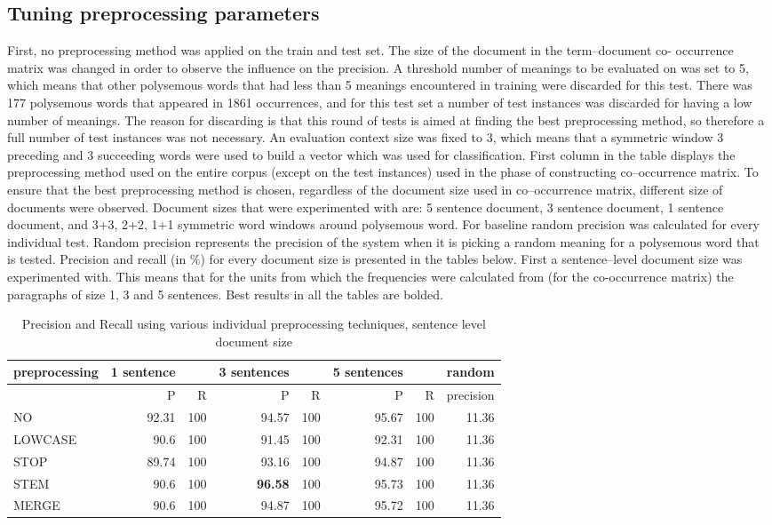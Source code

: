 \subsection{Tuning preprocessing parameters}
First, no preprocessing method was applied on the train and test set. The size of the document in the term--document co-
occurrence matrix was changed in order to observe the influence on the precision. A threshold number of meanings to be evaluated on was set to 5, which means that other polysemous words that had less than 5 meanings encountered in training were discarded for this test. There was 177 polysemous words that appeared in 1861 occurrences, and for this test set a number of test instances was discarded for having a 
low number of meanings. The reason for discarding is that this round of tests is aimed at finding the best preprocessing method, so therefore a full number of test instances was not necessary.  
 An evaluation context size was fixed to 3, which means that a symmetric window 3 preceding and 3 succeeding words were used to build a vector which was used for classification. First column in the table displays the preprocessing method used on the entire corpus (except on the test instances) used in the phase of constructing co--occurrence matrix. To ensure that the best preprocessing method is chosen, regardless of the 
document size used in co--occurrence matrix, different size of documents were observed. Document sizes that were
experimented with are: 5 sentence document, 3 sentence document, 1 sentence document, and 3+3, 2+2, 1+1 symmetric word windows around polysemous word.  
For baseline random precision was calculated for every individual test. Random precision represents the precision of the system when it is picking a random meaning for a polysemous word that is tested. 
Precision and recall (in \%) for every document size is presented in the tables below. First a sentence--level 
document size was experimented with. This means that for the units from which the frequencies were calculated from (for the co-occurrence matrix) the paragraphs of size 1, 3 and 5 sentences. 
Best results in all the tables are bolded. 

\begin{table}[h!]
\begin{tabular}{ l | r r | r r | r r | r}
   preprocessing &  1 sentence && 3 sentences && 5 sentences  && random\\
\hline
	& P  &  R & P  &  R & P  &  R & precision\\
\hline\hline
 NO  & 92.31 & 100 & 94.57 & 100 & 95.67 & 100  &11.36 \\
LOWCASE  & 90.6 & 100 & 91.45 & 100 & 92.31 & 100 & 11.36 \\
STOP  & 89.74 & 100 & 93.16 & 100 & 94.87 & 100 & 11.36 \\
 STEM  & 90.6 & 100 & \textbf{96.58} & 100 & 95.73 & 100 & 11.36 \\
 MERGE  & 90.6 & 100 & 94.87 & 100 & 95.72 & 100 & 11.36 \\
\end{tabular}
\caption{Precision and Recall using various individual preprocessing techniques, sentence level document size}
\end{table}

